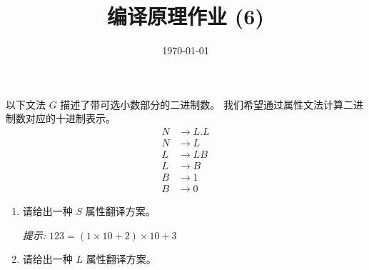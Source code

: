 \documentclass[a4paper, justified]{tufte-handout}
\title{编译原理作业 (6)}
\date{\today}
\begin{document}
\maketitle
\noplagiarism %
\begin{abstract}
\end{abstract}
\beginrequired

\begin{problem}[\score{10 = 5 + 5}]
  以下文法 $G$ 描述了带可选小数部分的二进制数。
  我们希望通过属性文法计算二进制数对应的十进制表示。
  \begin{align*}
    N &\to L . L \\
    N &\to L \\
    L &\to LB \\
    L &\to B \\
    B &\to 1 \\
    B &\to 0
  \end{align*}

  \begin{enumerate}[(1)]
    \item 请给出一种 $S$ 属性翻译方案。

      {\it 提示: $123 = (1 \times 10 + 2) \times 10 + 3$}
    \item 请给出一种 $L$ 属性翻译方案。
  \end{enumerate}
\end{problem}
\end{document}
